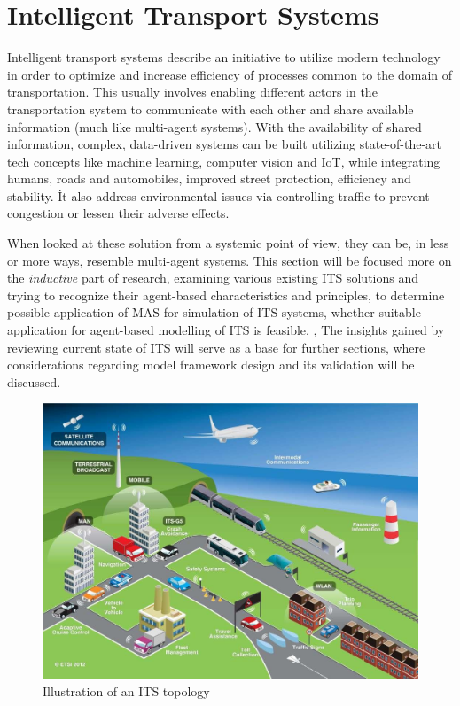 \documentclass[main.tex]{subfiles}
\begin{document}
\section{Intelligent Transport Systems}\label{sec-its}

Intelligent transport systems describe an initiative to utilize modern technology 
in order to optimize and increase efficiency of processes common to the domain of transportation. 
This usually involves enabling different actors in the transportation system to communicate 
with each other and share available information (much like multi-agent systems). With the 
availability of shared information, complex, data-driven systems can be built utilizing 
state-of-the-art tech concepts like machine learning, computer vision and IoT, while
integrating humans, roads and automobiles, improved street protection, efficiency and stability.
İt also address environmental issues via controlling traffic to prevent congestion or lessen
their adverse effects. 

When looked at these solution from a systemic point of view, they can 
be, in less or more ways, resemble multi-agent systems. This section will be focused more on 
the \emph{inductive} part of research, examining various existing ITS solutions and trying 
to recognize their agent-based characteristics and principles, to determine possible application 
of MAS for simulation of ITS systems, whether suitable application for agent-based modelling of 
ITS is feasible. , The insights gained by reviewing current state of ITS will 
serve as a base for further sections, where considerations regarding model framework design and 
its validation will be discussed. 

\begin{figure}[htbp]
    \centering
    \includegraphics[width=.8\textwidth]{ITS-schema.jpg}
    \caption{Illustration of an ITS topology \cite{ETSI}}
    \label{its-map}
\end{figure}
\end{document}
